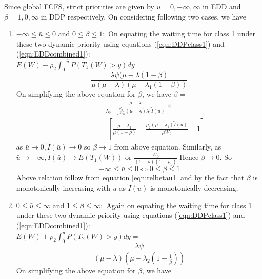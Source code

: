 \documentclass[a4paper,12pt]{article}
\newenvironment{mylemma}[1]{{ \textbf{\textit{Proof of Lemma #1:}}}}{}
\begin{document}
\begin{appendices}
\begin{mylemma}{\ref{clm:equivalenceDDPnEDD}}
Since global FCFS, strict priorities are given by $\bar{u} = 0, -\infty, \infty$ in EDD and $\beta = 1, 0, \infty$ in DDP respectively. On considering following two cases, we have
\begin{enumerate}
\item $-\infty \le \bar{u} \le 0$ and $0 \le \beta \le 1:$ On equating the waiting time for class 1 under these two dynamic priority using equations (\ref{eqn:DDPclass1}) and (\ref{eqn:EDDcombined1}):\\ $E(W) - \rho_2\int_0^{-\bar{u}}P(T_1(W)> y)dy =$
\begin{equation}
 \frac{\lambda \psi(\mu - \lambda(1-\beta)}{\mu(\mu -\lambda)(\mu - \lambda_1(1-\beta))}
\end{equation}  
On simplifying the above equation for $\beta$, we have $\beta =$
\begin{eqnarray}\nonumber
  \frac{\mu-\lambda}{\lambda_2+\frac{\rho_2}{\mu W_0}(\mu-\lambda)\lambda_1 \tilde{I}(\bar{u})}\times
  \end{eqnarray}
\begin{eqnarray}\label{eqn:relbetau1}
\hspace{2cm}\left[\frac{\mu-\lambda_1}{\mu(1 - \rho)} - \frac{\rho_2(\mu-\lambda_1)\tilde{I}(\bar{u})}{\mu W_0} - 1\right]
\end{eqnarray}
as $\bar{u} \rightarrow 0, \tilde{I}(\bar{u}) \rightarrow 0$ so $\beta \rightarrow 1$ from above equation. Similarly, as $\bar{u} \rightarrow -\infty, \tilde{I}(\bar{u}) \rightarrow E(T_1(W))$ or $\frac{W_0}{(1-\rho)(1-\rho_1)}$ Hence $\beta \rightarrow 0$. So
$$-\infty \le \bar{u} \le 0 \Leftrightarrow 0 \le \beta \le 1$$ 
Above relation follow from equation \ref{eqn:relbetau1} and by the fact that $\beta$ is monotonically increasing with $\bar{u}$ as $\tilde{I}(\bar{u})$ is monotonically decreasing. 
\item $0 \le \bar{u} \le \infty$ and $1 \le \beta \le \infty:$ Again on equating the waiting time for class 1 under these two dynamic priority using equations (\ref{eqn:DDPclass1}) and (\ref{eqn:EDDcombined1}):\\
$E(W) + \rho_2\int_0^{\bar{u}}P(T_2(W)> y)dy =$
\begin{equation}
 \frac{\lambda \psi}{(\mu -\lambda)(\mu - \lambda_2(1-\frac{1}{\beta}))}
\end{equation} 
On simplifying the above equation for $\beta$, we have
\begin{equation}\label{eqn:relbetau2}

\end{equation}
\end{enumerate}
\end{mylemma}
\end{appendices}
\end{document}
